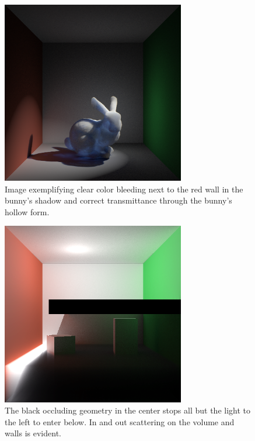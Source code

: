 \documentclass[runningheads]{llncs}
\begin{document}
\begin{figure}[h!]
    \centering
    \includegraphics[width=80mm]{img/bunny_spot/spot_right_new.png}
    \caption{Image exemplifying clear color bleeding next to the red wall in the bunny's shadow and correct transmittance through the bunny's hollow form.}
\end{figure}

\begin{figure}[h!]
    \centering
    \includegraphics[width=80mm]{img/one_side_corrected.png}
    \caption{The black occluding geometry in the center stops all but the light to the left to enter below.  In and out scattering on the volume and walls is evident.}
\end{figure}
\end{document}
